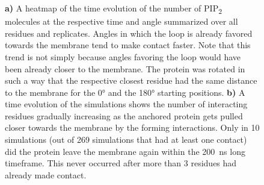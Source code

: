 \documentclass[
  twocolumn]{biophys-new-mod}
\begin{document}
\begin{figure}
\begin{minipage}[t]{0.50\linewidth}
{{}

}

\subcaption{\label{fig-f0f1-retention}~}
\end{minipage}%

\caption{\label{fig-loop-importance}\textbf{a)} A heatmap of the time
evolution of the number of PIP\textsubscript{2} molecules at the
respective time and angle summarized over all residues and replicates.
Angles in which the loop is already favored towards the membrane tend to
make contact faster. Note that this trend is not simply because angles
favoring the loop would have been already closer to the membrane. The
protein was rotated in such a way that the respective closest residue
had the same distance to the membrane for the 0° and the 180° starting
positions. \textbf{b)} A time evolution of the simulations shows the
number of interacting residues gradually increasing as the anchored
protein gets pulled closer towards the membrane by the forming
interactions. Only in 10 simulations (out of 269 simulations that had at
least one contact) did the protein leave the membrane again within the
200~ns long timeframe. This never occurred after more than 3 residues
had already made contact.}

\end{figure}
\end{document}
